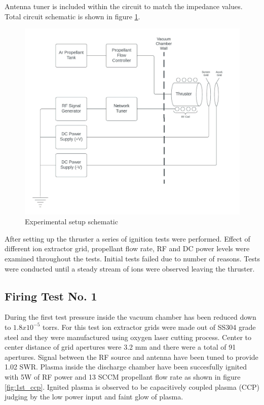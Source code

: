Antenna tuner is included within the circuit to match the impedance values. Total circuit schematic is shown in figure \ref{fig:schematic}.

\begin{figure}[ht]
    \centering
    \includegraphics{fig/thrusterschematic.jpeg}
    \caption{Experimental setup schematic}
    \label{fig:schematic}
\end{figure}

After setting up the thruster a series of ignition tests were performed. Effect of different ion extractor grid, propellant flow rate, RF and DC power levels were examined throughout the tests. Initial tests failed due to number of reasons. Tests were conducted until a steady stream of ions were observed leaving the thruster. 

\newpage
\subsection{Firing Test No. 1}
During the first test pressure inside the vacuum chamber has been reduced down to $1.8x10^{-5}$ torrs. For this test ion extractor grids were made out of SS304 grade steel and they were manufactured using oxygen laser cutting process. Center to center distance of grid apertures were 3.2 mm and there were a total of 91 apertures. Signal between the RF source and antenna have been tuned to provide 1.02 SWR. Plasma inside the discharge chamber have been succesfully ignited with 5W of RF power and 13 SCCM propellant flow rate as shown in figure \ref{fig:1st_ccp}. Ignited plasma is observed to be capacitively coupled plasma (CCP) judging by the low power input and faint glow of plasma. 

